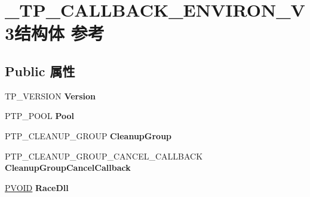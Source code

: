 \hypertarget{struct___t_p___c_a_l_l_b_a_c_k___e_n_v_i_r_o_n___v3}{}\section{\+\_\+\+T\+P\+\_\+\+C\+A\+L\+L\+B\+A\+C\+K\+\_\+\+E\+N\+V\+I\+R\+O\+N\+\_\+\+V3结构体 参考}
\label{struct___t_p___c_a_l_l_b_a_c_k___e_n_v_i_r_o_n___v3}
\subsection*{Public 属性}
\begin{DoxyCompactItemize}
\item 
\mbox{\label{struct___t_p___c_a_l_l_b_a_c_k___e_n_v_i_r_o_n___v3_a919829b94555ad50e68839b2bde2f564}} 
T\+P\+\_\+\+V\+E\+R\+S\+I\+ON {\bfseries Version}
\item 
\mbox{\label{struct___t_p___c_a_l_l_b_a_c_k___e_n_v_i_r_o_n___v3_a6996fee800b3a01c572cde1a030c7924}} 
P\+T\+P\+\_\+\+P\+O\+OL {\bfseries Pool}
\item 
\mbox{\label{struct___t_p___c_a_l_l_b_a_c_k___e_n_v_i_r_o_n___v3_a1be048e46a4cf79ed0ec1e355285d818}} 
P\+T\+P\+\_\+\+C\+L\+E\+A\+N\+U\+P\+\_\+\+G\+R\+O\+UP {\bfseries Cleanup\+Group}
\item 
\mbox{\label{struct___t_p___c_a_l_l_b_a_c_k___e_n_v_i_r_o_n___v3_aab066a1680afd678aa9d6dc0f040e9f9}} 
P\+T\+P\+\_\+\+C\+L\+E\+A\+N\+U\+P\+\_\+\+G\+R\+O\+U\+P\+\_\+\+C\+A\+N\+C\+E\+L\+\_\+\+C\+A\+L\+L\+B\+A\+CK {\bfseries Cleanup\+Group\+Cancel\+Callback}
\item 
\mbox{\label{struct___t_p___c_a_l_l_b_a_c_k___e_n_v_i_r_o_n___v3_a459e8256343228dd81b6a38212bb3a1a}} 
\hyperlink{interfacevoid}{P\+V\+O\+ID} {\bfseries Race\+Dll}
\item 
\mbox{\label{struct___t_p___c_a_l_l_b_a_c_k___e_n_v_i_r_o_n___v3_ab5d6b0c596447202fcf8e50095ebc99e}} 

\end{DoxyCompactItemize}
